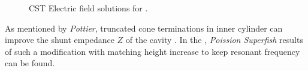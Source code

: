 \documentclass[a4paper,oneside,12pt]{report}
\numberwithin{equation}{chapter}
\begin{document}
\fi
\begin{figure}[H]
    \centering
    \qquad{}%
    \vspace{20pt}
    \caption{\centering CST Electric field solutions for .} 
    \label{fig:cst_simple_cavity_designs}
\end{figure}
As mentioned by \textit{Pottier}, truncated cone terminations in inner cylinder can improve the shunt empedance $Z$ of the cavity \cite{rhodo_pottier}. 
In the , \textit{Poission Superfish} results of such a modification with matching height increase to keep resonant frequency can be found.
\iffalse
\end{document}
